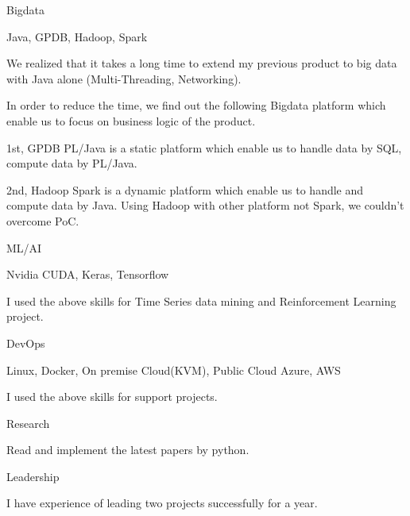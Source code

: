 \begin{cvskills}
  \cvskill
    {Bigdata}
    {
      \begin{cvitems}
        \item {Java, GPDB, Hadoop, Spark}
		\item {We realized that it takes a long time to extend my previous product to big data with Java alone (Multi-Threading, Networking).}
        \item {In order to reduce the time, we find out the following Bigdata platform which enable us to focus on business logic of the product.}
        \item {1st, GPDB PL/Java is a static platform which enable us to handle data by SQL, compute data by PL/Java.}
        \item {2nd, Hadoop Spark is a dynamic platform which enable us to handle and compute data by Java. Using Hadoop with other platform not Spark, we couldn't overcome PoC.}
      \end{cvitems}
    }

  \cvskill
    {ML/AI}
    {
      \begin{cvitems}
        \item {Nvidia CUDA, Keras, Tensorflow}
		\item {I used the above skills for Time Series data mining and Reinforcement Learning project.}
      \end{cvitems}
    }

  \cvskill
    {DevOps} %
    {
      \begin{cvitems}
      \item {Linux, Docker, On premise Cloud(KVM), Public Cloud Azure, AWS}
      \item {I used the above skills for support projects.}
      \end{cvitems}
    } %

  \cvskill
    {Research} %
    {
      \begin{cvitems}
      \item {Read and implement the latest papers by python.}
      \end{cvitems}
    } %

  \cvskill
    {Leadership} %
    {
      \begin{cvitems}
      \item {I have experience of leading two projects successfully for a year.}
      \end{cvitems}
    } %


\end{cvskills}
